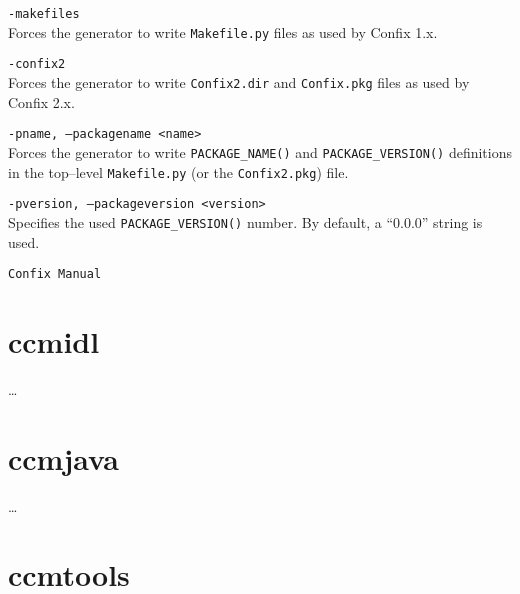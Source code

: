 \begin{description}
  \item {\tt -makefiles} \\
    Forces the generator to write {\tt Makefile.py} files as used by Confix 1.x.

  \item {\tt -confix2} \\
    Forces the generator to write {\tt Confix2.dir} and {\tt Confix.pkg} files as used by Confix 2.x.

  \item {\tt -pname, --packagename <name>} \\
  	Forces the generator to write {\tt PACKAGE\_NAME()} and  
	{\tt PACKAGE\_VERSION()} definitions in the top--level {\tt Makefile.py} (or the
	{\tt Confix2.pkg}) file.
  
  \item {\tt -pversion, --packageversion <version>} \\ 
    Specifies the used {\tt PACKAGE\_VERSION()} number. By default, a ``0.0.0'' string
    is used.
  
\item [SEE ALSO:]
   {\tt Confix Manual}
\end{description}



\newpage
\section{ccmidl}
\dots



\newpage
\section{ccmjava}
\dots




\newpage
\section{ccmtools}

